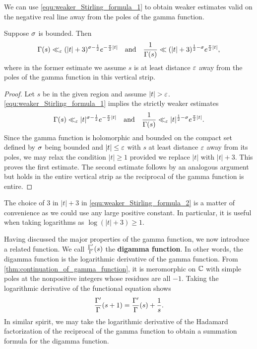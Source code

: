     We can use \cref{equ:weaker_Stirling_formula_1} to obtain weaker estimates valid on the negative real line away from the poles of the gamma function.

    \begin{corollary}\label{equ:weaker_Stirling_formula_2}
      Suppose \(\sigma\) is bounded. Then
      \[
        \Gamma(s) \ll_{\varepsilon} (|t|+3)^{\sigma-\frac{1}{2}}e^{-\frac{\pi}{2}|t|} \quad \text{and} \quad \frac{1}{\Gamma(s)} \ll (|t|+3)^{\frac{1}{2}-\sigma}e^{\frac{\pi}{2}|t|},
      \]
      where in the former estimate we assume \(s\) is at least distance \(\varepsilon\) away from the poles of the gamma function in this vertical strip.
    \end{corollary}
    \begin{proof}
      Let \(s\) be in the given region and assume \(|t| > \varepsilon\). \cref{equ:weaker_Stirling_formula_1} implies the strictly weaker estimates
      \[
        \Gamma(s) \ll_{\varepsilon} |t|^{\sigma-\frac{1}{2}}e^{-\frac{\pi}{2}|t|} \quad \text{and} \quad \frac{1}{\Gamma(s)} \ll_{\varepsilon} |t|^{\frac{1}{2}-\sigma}e^{\frac{\pi}{2}|t|}.
      \]
      Since the gamma function is holomorphic and bounded on the compact set defined by \(\sigma\) being bounded and \(|t| \le \varepsilon\) with \(s\) at least distance \(\varepsilon\) away from its poles, we may relax the condition \(|t| \ge 1\) provided we replace \(|t|\) with \(|t|+3\). This proves the first estimate. The second estimate follows by an analogous argument but holds in the entire vertical strip as the reciprocal of the gamma function is entire.
    \end{proof}

    The choice of \(3\) in \(|t|+3\) in \cref{equ:weaker_Stirling_formula_2} is a matter of convenience as we could use any large positive constant. In particular, it is useful when taking logarithms as \(\log(|t|+3) \ge 1\).

    Having discussed the major properties of the gamma function, we now introduce a related function. We call \(\frac{\Gamma'}{\Gamma}(s)\) the \textbf{digamma function}. In other words, the digamma function is the logarithmic derivative of the gamma function. From \cref{thm:continuation_of_gamma_function}, it is meromorphic on \(\mathbb{C}\) with simple poles at the nonpositive integers whose residues are all \(-1\). Taking the logarithmic derivative of the functional equation shows
    \[
      \frac{\Gamma'}{\Gamma}(s+1) = \frac{\Gamma'}{\Gamma}(s)+\frac{1}{s}.
    \]
    In similar spirit, we may take the logarithmic derivative of the Hadamard factorization of the reciprocal of the gamma function to obtain a summation formula for the digamma function.

